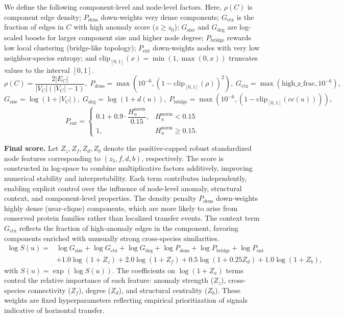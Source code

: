 \documentclass{article}
\begin{document}
We define the following component-level and node-level factors. 
Here, $\rho(C)$ is component edge density; $P_{\mathrm{dens}}$ down-weights very dense components; $G_{\mathrm{ctx}}$ is the fraction of edges in $C$ with high anomaly score ($z\ge z_0$); $G_{\mathrm{size}}$ and $G_{\mathrm{deg}}$ are log-scaled boosts for larger component size and higher node degree; $P_{\mathrm{bridge}}$ rewards low local clustering (bridge-like topology); $P_{\mathrm{ent}}$ down-weights nodes with very low neighbor-species entropy; and $\mathrm{clip}_{[0,1]}(x)=\min(1,\max(0,x))$ truncates values to the interval $[0,1]$.
\begin{equation}
\rho(C)=\frac{2|E_C|}{|V_C|(|V_C|-1)},\;
P_{\mathrm{dens}}=\max(10^{-6},(1-\mathrm{clip}_{[0,1]}(\rho))^{2}),\;
G_{\mathrm{ctx}}=\max(\mathrm{high\_z\_frac},10^{-6}),
\end{equation}
\begin{equation}
G_{\mathrm{size}}=\log(1+|V_C|),\;
G_{\mathrm{deg}}=\log(1+d(u)),\;
P_{\mathrm{bridge}}=\max(10^{-6},(1-\mathrm{clip}_{[0,1]}(cc(u)))),
\end{equation}
\begin{equation}
P_{\mathrm{ent}}=
\begin{cases}
0.1+0.9\cdot \dfrac{H_u^{\mathrm{norm}}}{0.15}, & H_u^{\mathrm{norm}}<0.15\\
1, & H_u^{\mathrm{norm}}\ge 0.15.
\end{cases}
\end{equation}

\vspace{0.5em}
\textbf{Final score.} Let $Z_z,Z_f,Z_d,Z_b$ denote the positive-capped robust standardized node features corresponding to $(z_5,f,d,b)$, respectively. The score is constructed in log-space to combine multiplicative factors additively, improving numerical stability and interpretability. Each term contributes independently, enabling explicit control over the influence of node-level anomaly, structural context, and component-level properties.
The density penalty $P_{\mathrm{dens}}$ down-weights highly dense (near-clique) components, which are more likely to arise from conserved protein families rather than localized transfer events.
The context term $G_{\mathrm{ctx}}$ reflects the fraction of high-anomaly edges in the component, favoring components enriched with unusually strong cross-species similarities.
\begin{equation}
\begin{aligned}
\log S(u)={}&\log G_{\mathrm{size}}+\log G_{\mathrm{ctx}}+\log G_{\mathrm{deg}}
+\log P_{\mathrm{dens}}+\log P_{\mathrm{bridge}}+\log P_{\mathrm{ent}}\\
&+1.0\log(1+Z_z)+2.0\log(1+Z_f)+0.5\log(1+0.25Z_d)+1.0\log(1+Z_b),
\end{aligned}
\end{equation}
with $S(u)=\exp(\log S(u))$. The coefficients on $\log(1+Z_x)$ terms control the relative importance of each feature: anomaly strength ($Z_z$), cross-species connectivity ($Z_f$), degree ($Z_d$), and structural centrality ($Z_b$). 
These weights are fixed hyperparameters reflecting empirical prioritization of signals indicative of horizontal transfer.
\vspace{0.5em}
\end{document}
